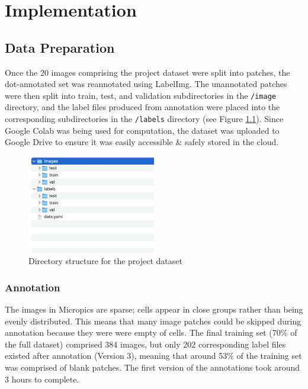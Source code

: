 
\chapter{Implementation}

\section{Data Preparation}
Once the 20 images comprising the project dataset were split into patches, the dot-annotated set was reannotated using LabelImg. The unannotated patches were then split into train, test, and validation subdirectories in the \verb`/image` directory, and the label files produced from annotation were placed into the corresponding subdirectories in the \verb`/labels` directory (see Figure \ref{directories}). Since Google Colab was being used for computation, the dataset was uploaded to Google Drive to ensure it was easily accessible \& safely stored in the cloud.

\begin{figure}[h!]
	\centering
	\includegraphics[width=0.5\textwidth]{images/04Implementation/directories.png}
	\caption{Directory structure for the project dataset}
	\label{directories}
\end{figure}

\subsection{Annotation}
The images in Micropics are sparse; cells appear in close groups rather than being evenly distributed. This means that many image patches could be skipped during annotation because they were were empty of cells. The final training set (70\% of the full dataset) comprised 384 images, but only 202 corresponding label files existed after annotation (Version 3), meaning that around 53\% of the training set was comprised of blank patches. The first version of the annotations took around 3 hours to complete.


